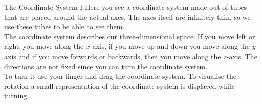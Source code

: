 \begin{surferPage}[Coordinates I]{The Coordinate System I}
Here you see a coordinate system made out of tubes that are placed around the actual axes. The axes itself are infinitely thin, so we use these tubes to be able to see them.\\
The coordinate system describes our three-dimensional space. If you move left or right, you move along the $x$-axis, if you move up and down you move along the $y$-axis and if you move forwards or backwards, then you move along the $z$-axis. The directions are not fixed since you can turn the coordinate system.\\
\vspace{0.3cm}
To turn it use your finger and drag the coordinate system. To visualise the rotation a small representation of the coordinate system is displayed while turning.
\end{surferPage}
